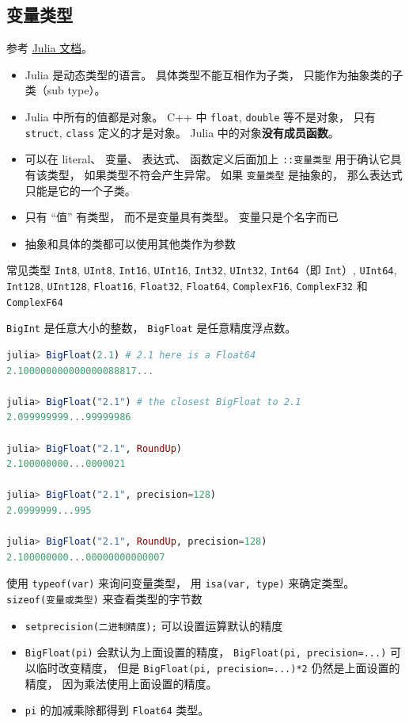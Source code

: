 
\subsection{变量类型}

参考 \href{https://docs.julialang.org/en/v1/manual/types/#man-declared-types}{Julia 文档}。
\begin{itemize}
\item Julia 是动态类型的语言。 具体类型不能互相作为子类， 只能作为抽象类的子类（sub type）。
\item Julia 中所有的值都是对象。 C++ 中 \verb`float`, \verb`double` 等不是对象， 只有 \verb`struct`, \verb`class` 定义的才是对象。 Julia 中的对象\textbf{没有成员函数}。
\item 可以在 literal、 变量、 表达式、 函数定义后面加上 \verb`::变量类型` 用于确认它具有该类型， 如果类型不符会产生异常。 如果 \verb`变量类型` 是抽象的， 那么表达式只能是它的一个子类。
\item 只有 “值” 有类型， 而不是变量具有类型。 变量只是个名字而已
\item 抽象和具体的类都可以使用其他类作为参数
\end{itemize}

常见类型
\verb`Int8`, \verb`UInt8`, \verb`Int16`, \verb`UInt16`, \verb`Int32`, \verb`UInt32`, \verb`Int64`（即 \verb`Int`）, \verb`UInt64`, \verb`Int128`, \verb`UInt128`, \verb`Float16`, \verb`Float32`, \verb`Float64`, \verb`ComplexF16`, \verb`ComplexF32` 和 \verb`ComplexF64`

\verb`BigInt` 是任意大小的整数， \verb`BigFloat` 是任意精度浮点数。

\begin{lstlisting}[language=julia]
julia> BigFloat(2.1) # 2.1 here is a Float64
2.100000000000000088817...

julia> BigFloat("2.1") # the closest BigFloat to 2.1
2.099999999...99999986

julia> BigFloat("2.1", RoundUp)
2.100000000...0000021

julia> BigFloat("2.1", precision=128)
2.0999999...995

julia> BigFloat("2.1", RoundUp, precision=128)
2.100000000...00000000000007
\end{lstlisting}

使用 \verb`typeof(var)` 来询问变量类型， 用 \verb`isa(var, type)` 来确定类型。 \verb`sizeof(变量或类型)` 来查看类型的字节数

\begin{itemize}
\item \verb`setprecision(二进制精度);` 可以设置运算默认的精度
\item \verb`BigFloat(pi)` 会默认为上面设置的精度， \verb`BigFloat(pi, precision=...)` 可以临时改变精度， 但是 \verb`BigFloat(pi, precision=...)*2` 仍然是上面设置的精度， 因为乘法使用上面设置的精度。
\item \verb`pi` 的加减乘除都得到 \verb`Float64` 类型。
\end{itemize}


